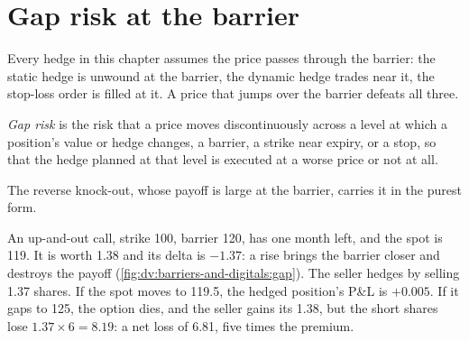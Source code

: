 \section{Gap risk at the barrier}

Every hedge in this chapter assumes the price passes through the barrier: the static hedge is unwound at the barrier,
the dynamic hedge trades near it, the stop-loss order is filled at it. A price that jumps over the barrier defeats all
three.

\begin{definition}\label{def:dv:barriers-and-digitals:gap}
\emph{Gap risk} is the risk that a price moves discontinuously across a level at which a position's value
or hedge changes, a barrier, a strike near expiry, or a stop, so that the hedge planned at that level is executed at a
worse price or not at all.
\end{definition}

The reverse knock-out, whose payoff is large at the barrier, carries it in the purest form.

\begin{example}\label{ex:dv:barriers-and-digitals:gap}
An up-and-out call, strike 100, barrier 120, has one month left, and the spot is 119. It is worth 1.38 and its delta is
$-1.37$: a rise brings the barrier closer and destroys the payoff
(\cref{fig:dv:barriers-and-digitals:gap}). The seller hedges by selling 1.37 shares. If the spot moves to 119.5, the
hedged position's P\&L is $+0.005$. If it gaps to 125, the option dies, and the seller gains its 1.38, but the short
shares lose $1.37\times6=8.19$: a net loss of 6.81, five times the premium.
\end{example}

